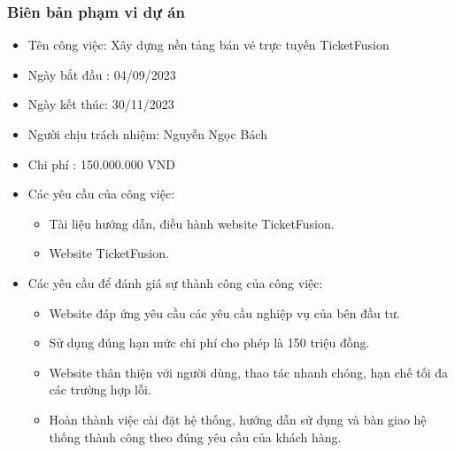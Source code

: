 \documentclass[12pt]{article}
\begin{document}
\subsubsection{Biên bản phạm vi dự án}
\begin{itemize}[label=-, leftmargin=1cm]
    \item Tên công việc: Xây dựng nền tảng bán vé trực tuyến TicketFusion
    \item Ngày bắt đầu : 04/09/2023
    \item Ngày kết thúc: 30/11/2023
    \item Người chịu trách nhiệm: Nguyễn Ngọc Bách
    \item Chi phí : 150.000.000 VND
    \item Các yêu cầu của công việc:
    \begin{itemize}[label=+, leftmargin=1cm]
        \item Tài liệu hướng dẫn, điều hành website TicketFusion.
        \item Website TicketFusion.
    \end{itemize}
    \item Các yêu cầu để đánh giá sự thành công của công việc:
    \begin{itemize}[label=+, leftmargin=1cm]
        \item Website đáp ứng yêu cầu các yêu cầu nghiệp vụ của bên đầu tư.
        \item Sử dụng đúng hạn mức chi phí cho phép là 150 triệu đồng.
        \item Website thân thiện với người dùng, thao tác nhanh chóng, hạn chế tối đa các trường hợp lỗi.
        \item Hoàn thành việc cài đặt hệ thống, hướng dẫn sử dụng và bàn giao hệ thống thành công theo đúng yêu cầu của khách hàng.
    \end{itemize}
\end{itemize}
\end{document}
